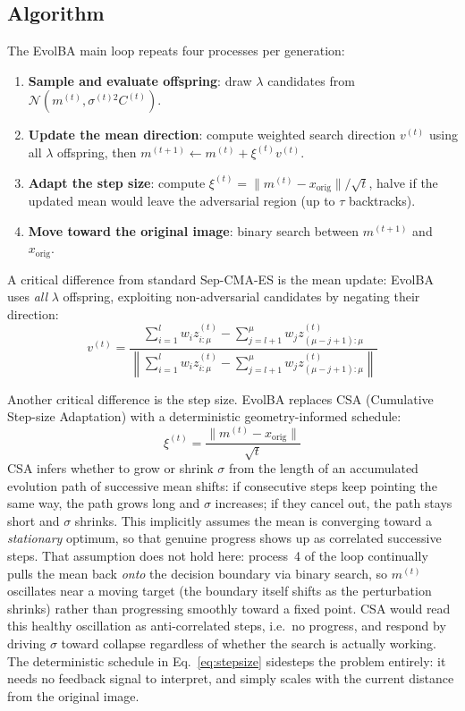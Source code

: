 \documentclass[11pt, a4paper]{article}
\begin{document}
\subsection{Algorithm}
\label{sec:evolba_algorithm}

The EvolBA main loop repeats four processes per generation:

\begin{enumerate}[noitemsep]
  \item \textbf{Sample and evaluate offspring}: draw $\lambda$ candidates from $\mathcal{N}(m^{(t)}, \sigma^{(t)2} C^{(t)})$.
  \item \textbf{Update the mean direction}: compute weighted search direction $v^{(t)}$ using all $\lambda$ offspring, then $m^{(t+1)} \leftarrow m^{(t)} + \xi^{(t)} v^{(t)}$.
  \item \textbf{Adapt the step size}: compute $\xi^{(t)} = \|m^{(t)} - x_{\mathrm{orig}}\| / \sqrt{t}$, halve if the updated mean would leave the adversarial region (up to $\tau$ backtracks).
  \item \textbf{Move toward the original image}: binary search between $m^{(t+1)}$ and $x_{\mathrm{orig}}$.
\end{enumerate}

A critical difference from standard Sep-CMA-ES is the mean update: EvolBA uses \emph{all} $\lambda$ offspring, exploiting non-adversarial candidates by negating their direction:
\begin{equation}
  v^{(t)} = \frac{\displaystyle\sum_{i=1}^{l} w_i z_{i:\mu}^{(t)} - \sum_{j=l+1}^{\mu} w_j z_{(\mu-j+1):\mu}^{(t)}}{\left\| \displaystyle\sum_{i=1}^{l} w_i z_{i:\mu}^{(t)} - \sum_{j=l+1}^{\mu} w_j z_{(\mu-j+1):\mu}^{(t)} \right\|}
  \label{eq:meanshift}
\end{equation}

Another critical difference is the step size. EvolBA replaces CSA (Cumulative Step-size Adaptation) with a deterministic geometry-informed schedule:
\begin{equation}
  \xi^{(t)} = \frac{\|m^{(t)} - x_{\mathrm{orig}}\|}{\sqrt{t}}
  \label{eq:stepsize}
\end{equation}
CSA infers whether to grow or shrink $\sigma$ from the length of an accumulated evolution path of successive mean shifts: if consecutive steps keep pointing the same way, the path grows long and $\sigma$ increases; if they cancel out, the path stays short and $\sigma$ shrinks. This implicitly assumes the mean is converging toward a \emph{stationary} optimum, so that genuine progress shows up as correlated successive steps. That assumption does not hold here: process~4 of the loop continually pulls the mean back \emph{onto} the decision boundary via binary search, so $m^{(t)}$ oscillates near a moving target (the boundary itself shifts as the perturbation shrinks) rather than progressing smoothly toward a fixed point. CSA would read this healthy oscillation as anti-correlated steps, i.e.\ no progress, and respond by driving $\sigma$ toward collapse regardless of whether the search is actually working. The deterministic schedule in Eq.~\ref{eq:stepsize} sidesteps the problem entirely: it needs no feedback signal to interpret, and simply scales with the current distance from the original image.
\end{document}
